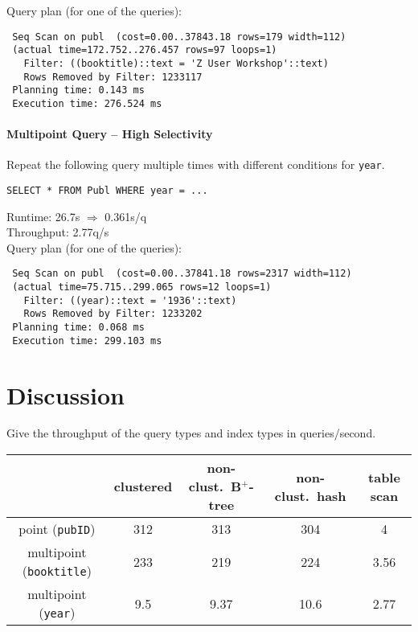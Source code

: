 \documentclass[11pt]{scrartcl}
\begin{document}
\smallskip\noindent
Query plan (for one of the queries):
{\small
\begin{verbatim}
 Seq Scan on publ  (cost=0.00..37843.18 rows=179 width=112)
 (actual time=172.752..276.457 rows=97 loops=1)
   Filter: ((booktitle)::text = 'Z User Workshop'::text)
   Rows Removed by Filter: 1233117
 Planning time: 0.143 ms
 Execution time: 276.524 ms
\end{verbatim}
}


\paragraph{Multipoint Query -- High Selectivity}

Repeat the following query multiple times with different conditions for {\tt year}.

{\small
\begin{verbatim}
SELECT * FROM Publ WHERE year = ...
\end{verbatim}
}

\noindent
\condC

\smallskip\noindent
Runtime: 26.7s $\Rightarrow$ 0.361s/q\\
Throughput: 2.77q/s\\


\smallskip\noindent
Query plan (for one of the queries):
{\small
\begin{verbatim}
 Seq Scan on publ  (cost=0.00..37841.18 rows=2317 width=112)
 (actual time=75.715..299.065 rows=12 loops=1)
   Filter: ((year)::text = '1936'::text)
   Rows Removed by Filter: 1233202
 Planning time: 0.068 ms
 Execution time: 299.103 ms
\end{verbatim}
}

\section{Discussion}

Give the throughput of the query types and index types in queries/second.
\begin{center}
  \begin{tabular}{c|c|c|c|c}
    & clustered & non-clust.\ B$^+$-tree & non-clust.\ hash & table scan \\
    \hline
    point ({\tt pubID}) & 312 & 313 & 304 & 4\\
    \hline
    multipoint ({\tt booktitle}) & 233 & 219 & 224 & 3.56 \\
    \hline
    multipoint  ({\tt year}) & 9.5 & 9.37 & 10.6 & 2.77 \\  
  \end{tabular}
\end{center}
\end{document}
